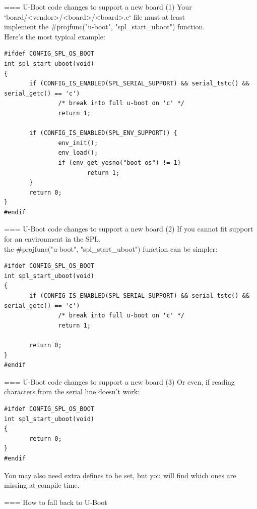 === U-Boot code changes to support a new board (1)
\small Your `board/<vendor>/<board>/<board>.c` file must at least\\
implement the #projfunc("u-boot", "spl_start_uboot") function.\\
Here's the most typical example:
\begin{block}{}
\begin{verbatim}
#ifdef CONFIG_SPL_OS_BOOT
int spl_start_uboot(void)
{
       if (CONFIG_IS_ENABLED(SPL_SERIAL_SUPPORT) && serial_tstc() && serial_getc() == 'c')
               /* break into full u-boot on 'c' */
               return 1;

       if (CONFIG_IS_ENABLED(SPL_ENV_SUPPORT)) {
               env_init();
               env_load();
               if (env_get_yesno("boot_os") != 1)
                       return 1;
       }
       return 0;
}
#endif
\end{verbatim}
\end{block}


=== U-Boot code changes to support a new board (2)
If you cannot fit support for an environment in the SPL,\\
the #projfunc("u-boot", "spl_start_uboot") function can be simpler:
\begin{block}{}
\begin{verbatim}
#ifdef CONFIG_SPL_OS_BOOT
int spl_start_uboot(void)
{
       if (CONFIG_IS_ENABLED(SPL_SERIAL_SUPPORT) && serial_tstc() && serial_getc() == 'c')
               /* break into full u-boot on 'c' */
               return 1;

       return 0;
}
#endif
\end{verbatim}
\end{block}


=== U-Boot code changes to support a new board (3)
Or even, if reading characters from the serial line doesn't work:
\begin{block}{}
\begin{verbatim}
#ifdef CONFIG_SPL_OS_BOOT
int spl_start_uboot(void)
{
       return 0;
}
#endif
\end{verbatim}
\end{block}
You may also need extra defines to be set, but you will find which ones are missing at compile time.


=== How to fall back to U-Boot
   
